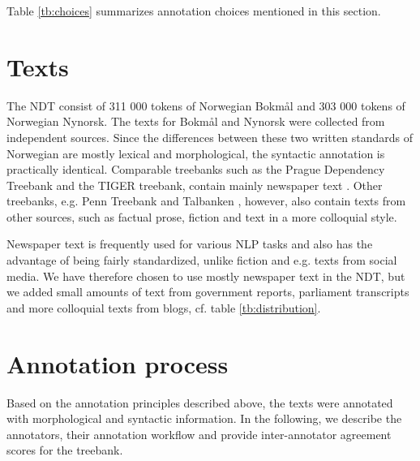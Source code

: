 \documentclass[10pt,a4paper]{article}
\begin{document}
Table \ref{tb:choices} summarizes annotation choices mentioned in this section.


\section{Texts}
The NDT consist of 311 000 tokens of Norwegian Bokmål and 303 000 tokens of Norwegian Nynorsk. The texts for Bokmål and Nynorsk were collected from independent sources. Since the differences between these two written standards of Norwegian are mostly lexical and morphological, the syntactic annotation is practically identical. Comparable treebanks such as the Prague Dependency Treebank and the TIGER treebank, contain mainly newspaper text \cite{Boh:Haj:Hla:2003,Bra:2004}. Other treebanks, e.g. Penn Treebank and Talbanken \cite{Mar:San:Mar:93,Niv:Nil:Hal:2006}, however, also contain texts from other sources, such as factual prose, fiction and text in a more colloquial style.

Newspaper text is frequently used for various NLP tasks and also has the advantage of being fairly standardized, unlike fiction and e.g. texts from social media. We have therefore chosen to use mostly newspaper text in the NDT, but we added small amounts of text from government reports, parliament transcripts and more colloquial texts from blogs, cf. table \ref{tb:distribution}.



\section{Annotation process}
Based on the annotation principles described above, the texts were
annotated with morphological and syntactic information. In the
following, we describe the annotators, their annotation workflow and
provide inter-annotator agreement scores for the treebank.
\end{document}
